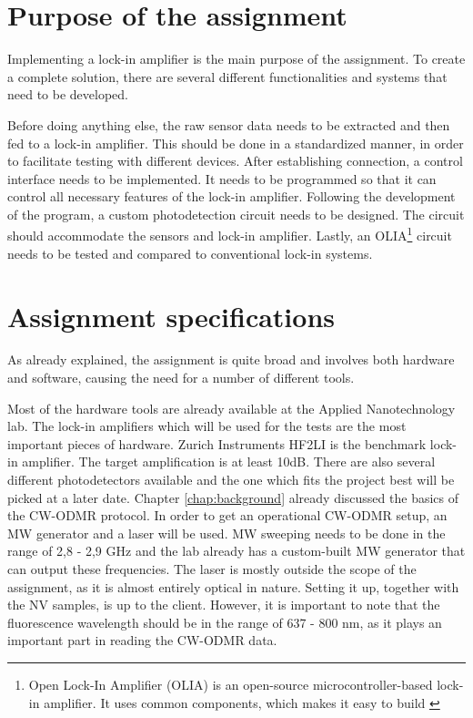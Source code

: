 \section{Purpose of the assignment}\label{purpose}
Implementing a lock-in amplifier is the main purpose of the assignment. To create a complete solution, there are several different functionalities and systems that need to be developed. 

Before doing anything else, the raw sensor data needs to be extracted and then fed to a lock-in amplifier. This should be done in a standardized manner, in order to facilitate testing with different devices. After establishing connection, a control interface needs to be implemented. It needs to be programmed so that it can control all necessary features of the lock-in amplifier. Following the development of the program, a custom photodetection circuit needs to be designed. The circuit should accommodate the sensors and lock-in amplifier. Lastly, an OLIA\footnote{Open Lock-In Amplifier (OLIA) is an open-source microcontroller-based lock-in amplifier. It uses common components, which makes it easy to build \cite{harvie2023olia}} circuit needs to be tested and compared to conventional lock-in systems. 


\section{Assignment specifications}\label{specifications}
As already explained, the assignment is quite broad and involves both hardware and software, causing the need for a number of different tools. 

Most of the hardware tools are already available at the Applied Nanotechnology lab. The lock-in amplifiers which will be used for the tests are the most important pieces of hardware. Zurich Instruments HF2LI is the benchmark lock-in amplifier. The target amplification is at least 10dB. There are also several different photodetectors available and the one which fits the project best will be picked at a later date. Chapter \ref{chap:background} already discussed the basics of the CW-ODMR protocol. In order to get an operational CW-ODMR setup, an MW generator and a laser will be used. MW sweeping needs to be done in the range of 2,8 - 2,9 GHz and the lab already has a custom-built MW generator that can output these frequencies. The laser is mostly outside the scope of the assignment, as it is almost entirely optical in nature. Setting it up, together with the NV samples, is up to the client. However, it is important to note that the fluorescence wavelength should be in the range of 637 - 800 nm, as it plays an important part in reading the CW-ODMR data.
	
